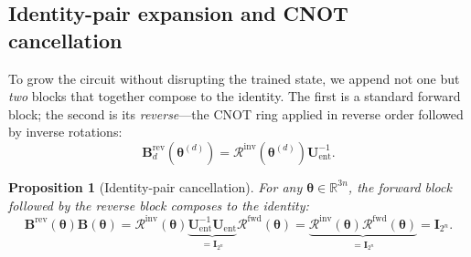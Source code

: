 \documentclass[11pt]{article}
\newcommand{\bbR}{\mathbb{R}}
\newtheorem{proposition}[theorem]{Proposition}
\theoremstyle{plain}
\theoremstyle{plain}
\begin{document}
\subsection{Identity-pair expansion and CNOT cancellation}
\label{sec:identity_pair}
To grow the circuit without disrupting the trained state, we append
not one but \emph{two} blocks that together compose to the identity.
The first is a standard forward block; the second is its
\emph{reverse}---the CNOT ring applied in reverse order followed by
inverse rotations:
\begin{equation}\label{eq:reverse_block}
  \mathbf{B}_d^{\mathrm{rev}}(\bm\theta^{(d)})
  = \mathcal{R}^{\mathrm{inv}}(\bm\theta^{(d)}) 
    \mathbf{U}_{\mathrm{ent}}^{-1}.
\end{equation}
\begin{proposition}[Identity-pair cancellation]
\label{prop:ip_cancel}
  For any $\bm\theta\in\bbR^{3n}$, the forward block followed by the
  reverse block composes to the identity:
  \begin{equation}\label{eq:ip_cancel}
    \mathbf{B}^{\mathrm{rev}}(\bm\theta) \mathbf{B}(\bm\theta)
    = \mathcal{R}^{\mathrm{inv}}(\bm\theta) 
      \underbrace{\mathbf{U}_{\mathrm{ent}}^{-1} \mathbf{U}_{\mathrm{ent}}}_{= \mathbf{I}_{2^n}}
      \mathcal{R}^{\mathrm{fwd}}(\bm\theta)
    = \underbrace{\mathcal{R}^{\mathrm{inv}}(\bm\theta) 
      \mathcal{R}^{\mathrm{fwd}}(\bm\theta)}_{= \mathbf{I}_{2^n}}
    = \mathbf{I}_{2^n}.
  \end{equation}
\end{proposition}
\end{document}
